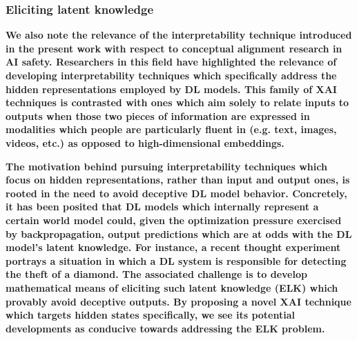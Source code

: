 \subsubsection{Eliciting latent knowledge}

\textbf{We also note the relevance of the interpretability technique introduced in the present work with respect to conceptual alignment research in AI safety. Researchers in this field have highlighted the relevance of developing interpretability techniques which specifically address the hidden representations employed by DL models. This family of XAI techniques is contrasted with ones which aim solely to relate inputs to outputs when those two pieces of information are expressed in modalities which people are particularly fluent in (e.g. text, images, videos, etc.) as opposed to high-dimensional embeddings.}

\textbf{The motivation behind pursuing interpretability techniques which focus on hidden representations, rather than input and output ones, is rooted in the need to avoid deceptive DL model behavior. Concretely, it has been posited that DL models which internally represent a certain world model could, given the optimization pressure exercised by backpropagation, output predictions which are at odds with the DL model's latent knowledge. For instance, a recent thought experiment portrays a situation in which a DL system is responsible for detecting the theft of a diamond. The associated challenge is to develop mathematical means of eliciting such latent knowledge (ELK) which provably avoid deceptive outputs. By proposing a novel XAI technique which targets hidden states specifically, we see its potential developments as conducive towards addressing the ELK problem.}